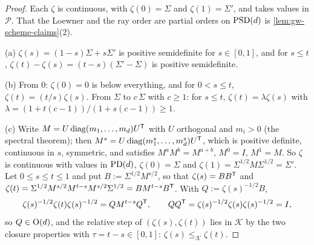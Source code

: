 \begin{proof}
\leanok
Each $\zeta$ is continuous, with $\zeta(0) = \Sigma$ and $\zeta(1) = \Sigma'$, and takes values in
$\mathcal P$. That the Loewner and the ray order are partial orders on $\mathrm{PSD}(d)$ is
\ref{lem:gw-scheme-claims}(2).

(a) $\zeta(s) = (1-s)\Sigma + s\Sigma'$ is positive semidefinite for $s \in [0,1]$, and for
$s \le t$, $\zeta(t) - \zeta(s) = (t - s)(\Sigma' - \Sigma)$ is positive semidefinite.

(b) From $0$: $\zeta(0) = 0$ is below everything, and for $0 < s \le t$, $\zeta(t) = (t/s)\zeta(s)$.
From $\Sigma$ to $c\,\Sigma$ with $c \ge 1$: for $s \le t$, $\zeta(t) = \lambda\zeta(s)$ with
$\lambda = (1 + t(c-1))/(1 + s(c-1)) \ge 1$.

(c) Write $M = U\operatorname{diag}(m_1, \dots, m_d)U^{\mathsf{T}}$ with $U$ orthogonal and $m_i > 0$
(the spectral theorem); then $M^s = U\operatorname{diag}(m_1^s, \dots, m_d^s)U^{\mathsf{T}}$, which is
positive definite, continuous in $s$, symmetric, and satisfies $M^aM^b = M^{a+b}$, $M^0 = I$,
$M^1 = M$. So $\zeta$ is continuous with values in $\mathrm{PD}(d)$, $\zeta(0) = \Sigma$ and
$\zeta(1) = \Sigma^{1/2}M\Sigma^{1/2} = \Sigma'$. Let $0 \le s \le t \le 1$ and put
$B := \Sigma^{1/2}M^{s/2}$, so that $\zeta(s) = BB^{\mathsf{T}}$ and
$\zeta(t) = \Sigma^{1/2}M^{s/2}M^{t-s}M^{s/2}\Sigma^{1/2} = BM^{t-s}B^{\mathsf{T}}$. With
$Q := \zeta(s)^{-1/2}B$,
\[
  \zeta(s)^{-1/2}\zeta(t)\zeta(s)^{-1/2} = QM^{t-s}Q^{\mathsf{T}},
  \qquad QQ^{\mathsf{T}} = \zeta(s)^{-1/2}\zeta(s)\zeta(s)^{-1/2} = I,
\]
so $Q \in \mathrm{O}(d)$, and the relative step of $(\zeta(s), \zeta(t))$ lies in $\mathcal K$ by the
two closure properties with $\tau = t - s \in [0,1]$: $\zeta(s) \le_{\mathcal K} \zeta(t)$.


\end{proof}
